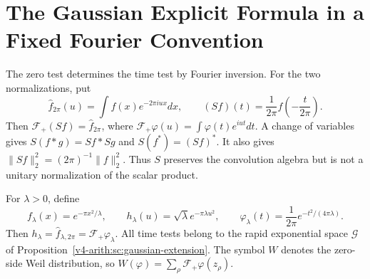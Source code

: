 \section{The Gaussian Explicit Formula in a Fixed Fourier Convention}
\label{v4-arith:w5-i:weil-gaussians}

The zero test determines the time test by Fourier inversion.
For the two normalizations, put
\[
 \widehat f_{2\pi}(u)=\int f(x)e^{-2\pi iux}dx,\qquad
 (Sf)(t)=\frac1{2\pi}f\left(-\frac{t}{2\pi}\right).
\]
Then $\mathcal F_+(Sf)=\widehat f_{2\pi}$, where
$\mathcal F_+\varphi(u)=\int\varphi(t)e^{iut}dt$.
A change of variables gives $S(f*g)=Sf*Sg$ and $S(f^*)=(Sf)^*$.
It also gives $\|Sf\|_2^2=(2\pi)^{-1}\|f\|_2^2$.
Thus $S$ preserves the convolution algebra but is not a unitary
normalization of the scalar product.

\begin{definition}
\label{v4-arith:w5-i:def:gaussian-family}
For $\lambda>0$, define
\[
 f_\lambda(x)=e^{-\pi x^2/\lambda},\qquad
 h_\lambda(u)=\sqrt\lambda e^{-\pi\lambda u^2},\qquad
 \varphi_\lambda(t)=\frac1{2\pi}e^{-t^2/(4\pi\lambda)}.
\]
Then $h_\lambda=\widehat f_{\lambda,2\pi}
=\mathcal F_+\varphi_\lambda$.
All time tests belong to the rapid exponential space $\mathscr G$
of Proposition~\ref{v4-arith:sc:gaussian-extension}.
The symbol $W$ denotes the zero-side Weil distribution, so
$W(\varphi)=\sum_\rho\mathcal F_+\varphi(z_\rho)$.
\end{definition}

